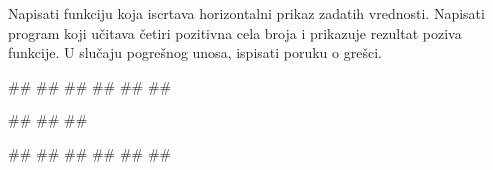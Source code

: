 \begin{Exercise}[label=p1.4_05] 
Napisati funkciju 
koja iscrtava horizontalni prikaz zadatih vrednosti. Napisati program
koji učitava četiri pozitivna cela broja i prikazuje rezultat poziva
funkcije. U slučaju pogrešnog unosa, ispisati poruku o grešci.
 
\begin{miditest}
\begin{upotreba}{1}
#\naslovInt#
##
#\izlaz{****}#
#\izlaz{*}#
#\izlaz{*******}#
#\izlaz{*****}#
\end{upotreba}
\end{miditest}
\begin{miditest}
\begin{upotreba}{2}
#\naslovInt#
##
##
\end{upotreba}
\end{miditest}

\begin{miditest}
\begin{upotreba}{3}
#\naslovInt#
##
#\izlaz{*****}#
#\izlaz{**}#
#\izlaz{**}#
#\izlaz{**********}#
\end{upotreba}
\end{miditest}
\end{Exercise}
\ifresenja 
\begin{Answer}[ref=p1.4_05]
\end{Answer} 
\fi


